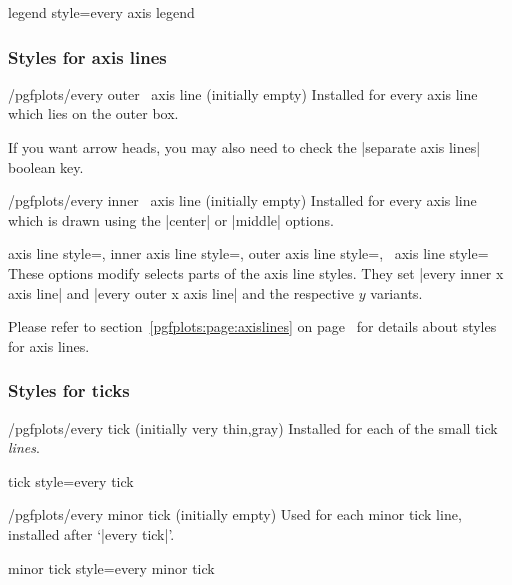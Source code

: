 \pgfplotsshortstylekey legend style=every axis legend\pgfeov

\subsubsection*{Styles for axis lines}
\begin{xystylekey}{/pgfplots/every outer \x\ axis line (initially empty)}
	Installed for every axis line which lies on the outer box.

	If you want arrow heads, you may also need to check the |separate axis lines| boolean key.
\end{xystylekey}

\begin{xystylekey}{/pgfplots/every inner \x\ axis line (initially empty)}
	Installed for every axis line which is drawn using the |center| or |middle| options.
\end{xystylekey}

\begin{pgfplotsxykeylist}{%
	axis line style=,
	inner axis line style=,
	outer axis line style=,
	\x\ axis line style=}
	These options modify selects parts of the axis line styles. They set |every inner x axis line| and |every outer x axis line| and the respective $y$ variants.
\end{pgfplotsxykeylist}

\noindent
Please refer to section~\ref{pgfplots:page:axislines} on page~\pageref{pgfplots:page:axislines} for details about styles for axis lines.



\subsubsection*{Styles for ticks}

\begin{stylekey}{/pgfplots/every tick (initially very thin,gray)}
 Installed for each of the small tick \emph{lines}.
\end{stylekey}

\pgfplotsshortstylekey tick style=every tick\pgfeov

\begin{stylekey}{/pgfplots/every minor tick  (initially empty)}
 Used for each minor tick line, installed after `|every tick|'.
\end{stylekey}

\pgfplotsshortstylekey minor tick style=every minor tick\pgfeov

